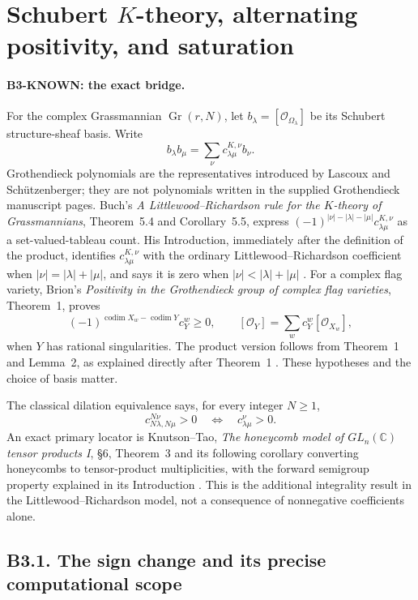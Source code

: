 \documentclass[11pt,a4paper]{article}
\begin{document}
\section{Schubert $K$-theory, alternating positivity, and saturation}
\label{sec:bridge-k}

\paragraph{B3-KNOWN: the exact bridge.}
For the complex Grassmannian $\operatorname{Gr}(r,N)$, let
$b_\lambda=[\mathcal O_{\Omega_\lambda}]$ be its Schubert structure-sheaf
basis.  Write
\[
 b_\lambda b_\mu=\sum_\nu c^{K,\nu}_{\lambda\mu}b_\nu.
\]
Grothendieck polynomials are the representatives introduced by Lascoux and
Sch\"utzenberger; they are not polynomials written in the supplied
Grothendieck manuscript pages.  Buch's \emph{A Littlewood--Richardson rule
for the $K$-theory of Grassmannians}, Theorem~5.4 and Corollary~5.5,
express $(-1)^{|\nu|-|\lambda|-|\mu|}c^{K,\nu}_{\lambda\mu}$ as a
set-valued-tableau count.  His Introduction, immediately after the
definition of the product, identifies $c^{K,\nu}_{\lambda\mu}$ with the
ordinary Littlewood--Richardson coefficient when
$|\nu|=|\lambda|+|\mu|$, and says it is zero when
$|\nu|<|\lambda|+|\mu|$ \cite{buch2002}.
For a complex flag variety, Brion's \emph{Positivity in the Grothendieck
group of complex flag varieties}, Theorem~1, proves
\[
 (-1)^{\operatorname{codim}X_w-\operatorname{codim}Y}
 c_Y^w\geq0,
 \qquad [\mathcal O_Y]=\sum_w c_Y^w[\mathcal O_{X_w}],
\]
when $Y$ has rational singularities.  The product version follows from
Theorem~1 and Lemma~2, as explained directly after Theorem~1
\cite{brion2002}.  These hypotheses and the choice of basis matter.

The classical dilation equivalence says, for every integer $N\geq1$,
\[
 c_{N\lambda,N\mu}^{N\nu}>0
 \quad\Longleftrightarrow\quad c_{\lambda\mu}^{\nu}>0.
\]
An exact primary locator is Knutson--Tao, \emph{The honeycomb model of
$GL_n(\mathbb C)$ tensor products I}, \S6, Theorem~3 and its following
corollary converting honeycombs to tensor-product multiplicities,
with the forward semigroup property explained in its Introduction
\cite{kt1999}.  This is the additional integrality result in the
Littlewood--Richardson model, not a consequence of nonnegative
coefficients alone.

\subsection*{B3.1. The sign change and its precise computational scope}
\end{document}
